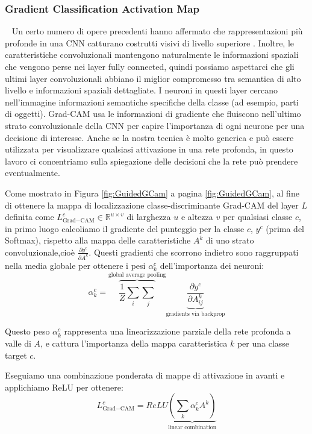 \subsubsection{Gradient Classification Activation Map}~\newline
Un certo numero di opere precedenti hanno affermato che rappresentazioni più profonde in una CNN catturano costrutti
visivi di livello superiore \cite{bengio2013representation, mahendran2016visualizing}. Inoltre, le caratteristiche
convoluzionali mantengono naturalmente le informazioni spaziali che vengono perse nei layer fully connected, quindi
possiamo aspettarci che gli ultimi layer convoluzionali abbiano il miglior compromesso tra semantica di alto livello 
e informazioni spaziali dettagliate.
I neuroni in questi layer cercano nell'immagine informazioni semantiche specifiche della classe (ad esempio, parti di
oggetti). Grad-CAM usa le informazioni di gradiente che fluiscono nell'ultimo strato convoluzionale della CNN per 
capire l'importanza di ogni neurone per una decisione di interesse. Anche se la nostra tecnica è molto generica e 
può essere utilizzata per visualizzare qualsiasi attivazione in una rete profonda, in questo lavoro ci concentriamo
sulla spiegazione delle decisioni che la rete può prendere eventualmente.

Come mostrato in Figura \ref{fig:GuidedGCam} a pagina \ref{fig:GuidedGCam}, al fine di ottenere la mappa di
localizzazione classe-discriminante Grad-CAM del layer $L$ definita come 
$L_{\text{Grad}-\text{CAM}}^{c}\in \mathbb{R}^{u \times v}$ di larghezza $u$ e altezza $v$ per qualsiasi classe $c$, 
in primo luogo calcoliamo il gradiente del punteggio per la classe $c$, $y^{c}$ (prima del Softmax), rispetto alla 
mappa delle caratteristiche $A^{k}$ di uno strato convoluzionale,cioè  $\frac{\partial y^{c}}{\partial A^{k}}$. 
Questi gradienti che scorrono indietro sono raggruppati nella media globale per ottenere i pesi 
$\alpha^{c}_{k}$ dell'importanza dei neuroni:
\[
    \alpha_{k}^{c}=\overbrace{\frac{1}{Z}\sum_{i}\sum_{j}}^{\text{global average pooling}}
    \underbrace{\frac{\partial y^{c}}{\partial A_{ij}^{k}}}_{\text{gradients via backprop}}\tag{1}
\]

Questo peso $\alpha^{c}_{k}$ rappresenta una linearizzazione parziale della rete profonda a valle di $A$, e 
cattura l'importanza della mappa caratteristica $k$ per una classe target $c$.

Eseguiamo una combinazione ponderata di mappe di attivazione in avanti e applichiamo ReLU per ottenere:
\[
    L_{\text{Grad}-\text{CAM}}^{c}=ReLU\underbrace{\left(\sum_{k}\alpha_{k}^{c}A^{k}\right)}_{\text{linear
    combination}}\tag{2}
\]

